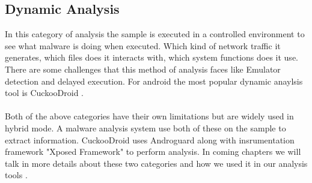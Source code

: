 \documentclass[../main.tex]{subfile}
\begin{document}
		\subsection[Dynamic Analysis]{Dynamic Analysis} In this category of analysis the sample is executed in a controlled environment to see what malware is doing when executed. Which kind of network traffic it generates, which files does it interacts with, which system functions does it use. There are some challenges that this method of analysis faces like Emulator detection and delayed execution. For android the most popular dynamic anaylsis tool is CuckooDroid \cite{cuckoodroid_github}.
		
		\paragraph{} Both of the above categories have their own limitations but are widely used in hybrid mode. A malware analysis system use both of these on the sample to extract information. CuckooDroid uses Androguard along with insrumentation framework "Xposed Framework" to perform analysis. In coming chapters we will talk in more details about these two categories and how we used it in our analysis tools \cite{cuckoodroid_github}.
		
\end{document}
